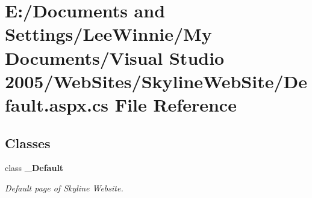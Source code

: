 \section{E:/Documents and Settings/Lee\-Winnie/My Documents/Visual Studio 2005/Web\-Sites/Skyline\-Web\-Site/Default.aspx.cs File Reference}
\label{_default_8aspx_8cs}
\subsection*{Classes}
\begin{CompactItemize}
\item 
class {\bf \_\-Default}
\begin{CompactList}\small\item\em Default page of Skyline Website. \item\end{CompactList}\end{CompactItemize}
